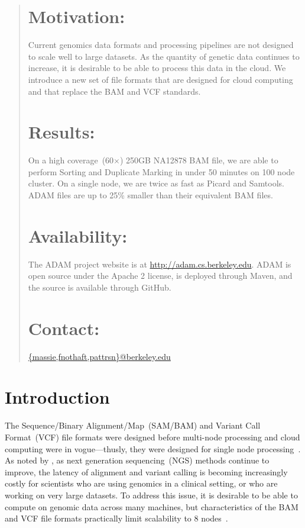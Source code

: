 \documentclass{bioinfo}
\begin{document}
\begin{abstract}

\section{Motivation:}
Current genomics data formats and processing pipelines are not designed to scale well to large datasets. As the quantity of genetic
data continues to increase, it is desirable to be able to process this data in the cloud. We introduce a new set of file formats that are
designed for cloud computing and that replace the BAM and VCF standards.

\section{Results:} On a high coverage~(60$\times$) 250GB NA12878 BAM file, we are able to perform Sorting and Duplicate Marking in under
50 minutes on 100 node cluster. On a single node, we are twice as fast as Picard and Samtools. ADAM files are up to 25\% smaller than
their equivalent BAM files.

\section{Availability:}
The ADAM project website is at \url{http://adam.cs.berkeley.edu}. ADAM is open source under the Apache 2 license, is deployed through Maven,
and the source is available through GitHub.

\section{Contact:} \href{massie@berkeley.edu}{\{massie,fnothaft,pattrsn\}@berkeley.edu}
\end{abstract}

\section{Introduction}
\label{sec:introduction}

The Sequence/Binary Alignment/Map~(SAM/BAM) and Variant Call Format~(VCF) file formats were designed before multi-node processing
and cloud computing were in vogue---thusly, they were designed for single node processing~\citep{li09}. As noted by \citet{mcpherson09}, as
next generation sequencing~(NGS) methods continue to improve, the latency of alignment and variant calling is becoming increasingly costly
for scientists who are using genomics in a clinical setting, or who are working on very large datasets. To address this issue, it is desirable to be
able to compute on genomic data across many machines, but characteristics of the BAM and VCF file formats practically limit scalability to 8
nodes~\citep{niemenmaa12}.
\end{document}

